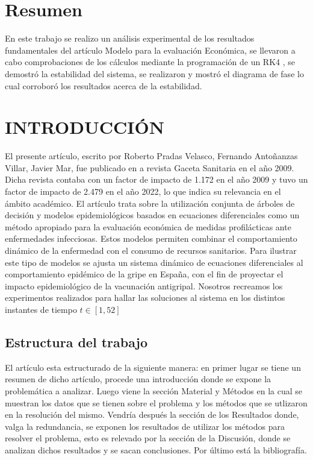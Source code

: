 \documentclass{wscpaperproc}
\theoremstyle{wsc}
\begin{document}
  

\maketitle
\newpage

\section*{Resumen}
En este trabajo se realizo un an\'alisis experimental de los resultados fundamentales
del art\'iculo Modelo para la evaluaci\'on Econ\'omica, se llevaron a cabo comprobaciones 
de los c\'alculos mediante la programaci\'on de un RK4 , se demostr\'o la estabilidad del sistema, se realizaron y mostr\'o el diagrama de fase lo cual corrobor\'o los resultados acerca de la estabilidad.\\

\section{INTRODUCCI\'ON}
El presente art\'iculo, escrito por Roberto Pradas Velasco, Fernando Antoñanzas Villar, Javier Mar, fue publicado en a revista Gaceta Sanitaria en el año 2009. 
Dicha revista  contaba con un factor de impacto de 1.172 en el a\~no 2009 y tuvo un factor de impacto de 2.479 en el a\~no 2022, lo que indica su 
relevancia en el \'ambito acad\'emico.
El art\'iculo trata sobre la utilizaci\'on conjunta de \'arboles de decisi\'on y modelos epidemiol\'ogicos basados en ecuaciones
diferenciales como un m\'etodo apropiado para la evaluaci\'on econ\'omica de medidas profil\'acticas ante
enfermedades infecciosas. Estos modelos permiten combinar el comportamiento din\'amico de la
enfermedad con el consumo de recursos sanitarios. Para ilustrar este tipo de modelos se ajusta un sistema
din\'amico de ecuaciones diferenciales al comportamiento epid\'emico de la gripe en España, con el fin de
proyectar el impacto epidemiol\'ogico de la vacunaci\'on antigripal. Nosotros recreamos los experimentos realizados para hallar las soluciones 
al sistema en los distintos instantes de tiempo $t \in [1,52] $
\label{sec:intro}

\subsection{Estructura del trabajo}
El art\'iculo esta estructurado de la siguiente manera: en primer lugar se tiene un resumen de dicho art\'iculo, procede una introducci\'on donde se expone la problem\'atica 
a analizar. Luego viene la secci\'on Material y M\'etodos en la cual se muestran los datos que se tienen sobre el problema y los m\'etodos que se utlizaron en la resoluci\'on 
del mismo. Vendr\'ia despu\'es la secci\'on de los Resultados donde, valga la redundancia, se exponen los resultados de utilizar los m\'etodos para resolver el problema, esto 
es relevado por la secci\'on de la Discusi\'on, donde se analizan dichos resultados y se sacan conclusiones. Por \'ultimo est\'a la bibliograf\'ia.
\end{document}

